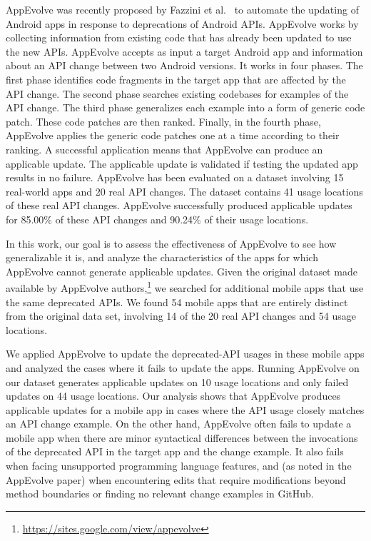 AppEvolve was recently proposed by Fazzini et
al.~\cite{fazzini2019automated} to automate the updating of Android apps in
response to deprecations of Android APIs.  AppEvolve works by collecting
information from existing code that has already been updated to use the new
APIs.  AppEvolve accepts as input a target Android app and information
about an API change between two Android versions. It works in four
phases. The first phase identifies code fragments in the target app that
are affected by the API change. The second phase searches existing
codebases for examples of the API change. The third phase generalizes each
example into a form of generic code patch. These code patches are then
ranked. Finally, in the fourth phase, AppEvolve applies the generic code
patches one at a time according to their ranking. A successful application
means that AppEvolve can produce an applicable update. The applicable
update is validated if testing the updated app results in no failure. AppEvolve has been evaluated on a dataset involving 15 real-world
apps and 20 real API changes. The dataset contains 41 usage locations of
these real API changes. AppEvolve successfully produced applicable updates
for 85.00\% of these API changes and 90.24\% of their usage locations.

In this work, our goal is to assess the effectiveness of AppEvolve to see
how generalizable it is, and analyze the characteristics of the apps for
which AppEvolve cannot generate applicable updates.  Given the original
dataset made available by AppEvolve
authors,\footnote{\url{https://sites.google.com/view/appevolve}} we
searched for additional mobile apps that use the same deprecated APIs. We
found 54 mobile apps that are entirely distinct from the original data set,
involving 14 of the 20 real API changes and 54 usage locations.

We applied AppEvolve to update the deprecated-API usages in these mobile
apps and analyzed the cases where it fails to update the apps. Running
AppEvolve on our dataset generates applicable updates on 10 usage locations
and only failed updates on 44 usage locations. Our analysis shows that
AppEvolve produces applicable updates for a mobile app in cases where the
API usage closely matches an API change example.  On the other hand,
AppEvolve often fails to update a mobile app when there are minor
syntactical differences between the invocations of the deprecated API in
the target app and the change example.  It also fails when facing
unsupported programming language features, and (as noted in the AppEvolve
paper) when encountering edits that require modifications beyond method
boundaries or finding no relevant change examples in GitHub.


